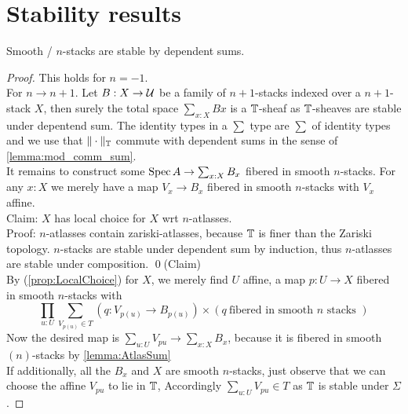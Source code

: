 \documentclass{article}
\newcommand{\red}[1]{{\color{red} #1}}
\begin{document}
\section{Stability results}
\begin{theorem}{\label{thM:stabSums}}
    Smooth /  $n$-stacks are stable by dependent sums.
\end{theorem}
\begin{proof}
    This holds for $n = -1$. \\
    For $n \to n+1$. Let $B : X \to \mathcal{U}$ be a family of  $n+1$-stacks indexed over a  $n+1$-stack $X$, then surely the total space $\sum_{x : X} B x$ is a $\mathbb{T}$-sheaf as $\mathbb{T}$-sheaves are stable under depentend sum. 
    The identity types in a $\sum$ type are $\sum$ of identity types \red{and we use that $\|\cdot\|_{\mathbb{T}}$  commute with dependent sums in the sense of \ref{lemma:mod_comm_sum}.}
    \\ %
    It remains to construct some $\operatorname{Spec} A \to \sum_{x : X} B_x$ fibered in smooth $n$-stacks.
    For any $x : X$ we merely have a map $V_x \to B_x$ fibered in smooth $n$-stacks with $V_x$ affine. \\
    Claim: $X$ has local choice for $X$ wrt  $n$-atlasses.\\
    Proof:
        $n$-atlasses contain zariski-atlasses, because $\mathbb{T}$ is finer than the Zariski topology.
         $n$-stacks are stable under dependent sum by induction, thus $n$-atlasses are stable under composition.         
    \qed(Claim)\\
    By (\ref{prop:LocalChoice}) for $X$, we merely find $U$ affine, a map $p : U \to X$ fibered in smooth $n$-stacks with
    \[
    \prod_{u : U} \sum_{V_{p(u)} \in T} (q : V_{p(u)} \to B_{p(u)}) \times (q \ \text{fibered in smooth } n \text{ stacks } )
    \]
    Now the desired map is $\sum_{u : U} V_{p u} \to \sum_{x : X} B_x$, because it is fibered in smooth $(n)$-stacks by \ref{lemma:AtlasSum} \\
    If additionally, all the $B_x$ and $X$ are smooth $n$-stacks, just observe that we can choose the affine $V_{p u}$ to lie in $\mathbb{T}$, Accordingly $\sum_{u : U} V_{p u} \in T$ as $\mathbb{T}$ is stable under $\Sigma$.
    
\end{proof}
\end{document}
